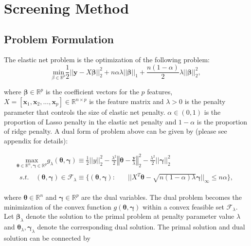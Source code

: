 

\section{Screening Method}
\subsection{Problem Formulation}

The elastic net problem is the optimization of the following problem:
\begin{equation}
    \label{eq:enet}
    \underset{\beta\in \mathbb{R}^p}{\mathrm{min}}\frac{1}{2}||\boldsymbol y-X\boldsymbol\beta||_2^2+n\alpha\lambda||\boldsymbol\beta||_1+\frac{n(1-\alpha)}{2}\lambda||\boldsymbol\beta||_2^2,
\end{equation}

where $\boldsymbol\beta\in\mathbb{R}^p$ is the coefficient vectors for the $p$ features, $X=[\boldsymbol x_1,\boldsymbol x_2,...,\boldsymbol x_p]\in\mathbb{R}^{n\times p}$ is the feature matrix and $\lambda>0$ is the penalty parameter that controls the size of elastic net penalty. $\alpha\in(0,1)$ is the proportion of Lasso penalty in the elastic net penalty and $1-\alpha$ is the proportion of ridge penalty. A dual form of problem above can be given by (please see appendix for details):

\begin{gather}
        \label{eq:dualtheta}
        \underset{\boldsymbol\theta\in \mathbb{R}^{ n},\boldsymbol\gamma\in\mathbb{R}^p}{\mathrm{max}}g_\lambda(\boldsymbol\theta,\boldsymbol\gamma)\equiv\frac{1}{2}||y||_2^2-\frac{\lambda^2}{2}\left\Vert\boldsymbol\theta-\frac{\boldsymbol y}{\lambda}\right\Vert_2^2-\frac{\lambda^2}{2}||\boldsymbol\gamma||_2^2\\
        \begin{aligned}s.t.\quad (\boldsymbol\theta,\boldsymbol\gamma)\in \mathcal{F}_\lambda\equiv\{(\boldsymbol\theta,\boldsymbol\gamma):\quad
            &||X^T\boldsymbol\theta-\sqrt{n(1-\alpha)\lambda}\boldsymbol\gamma||_\infty\leq n\alpha\}\nonumber,
        \end{aligned}
\end{gather}

where $\boldsymbol\theta\in \mathbb{R}^{n}$ and $\boldsymbol\gamma\in\mathbb{R}^p$ are the dual variables. The dual problem becomes the minimization of the convex function $g(\boldsymbol\theta,\boldsymbol
\gamma)$ within a convex feasible set $\mathcal{F}_\lambda$. Let $\boldsymbol\beta_\lambda$ denote the solution to the primal problem at penalty parameter value $\lambda$ and $\boldsymbol\theta_{\lambda},\boldsymbol\gamma_\lambda$ denote the corresponding dual solution. The primal solution and dual solution can be connected by


